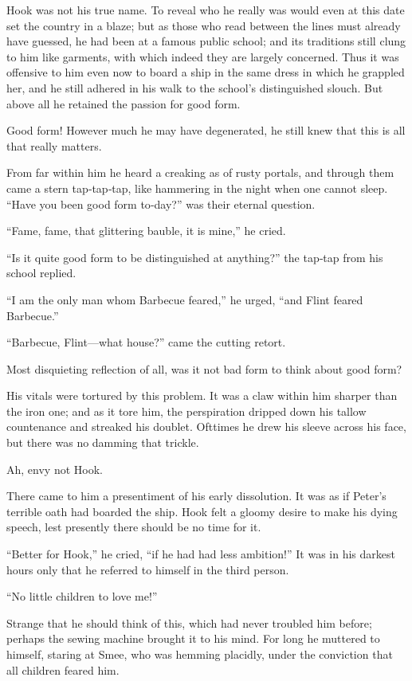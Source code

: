 Hook was not his true name.
To reveal who he really was would even at this date set the country in a blaze;
but as those who read between the lines must already have guessed, he had been at a famous public school;
and its traditions still clung to him like garments,
with which indeed they are largely concerned.
Thus it was offensive to him even now to board a ship in the same dress in which he grappled her,
and he still adhered in his walk to the school’s distinguished slouch.
But above all he retained the passion for good form.

Good form!
However much he may have degenerated, he still knew that this is all that really matters.

From far within him he heard a creaking as of rusty portals,
and through them came a stern tap‐tap‐tap, like hammering in the night when one cannot sleep.
“Have you been good form to‐day?\@” was their eternal question.

“Fame, fame, that glittering bauble, it is mine,” he cried.

“Is it quite good form to be distinguished at anything?\@” the tap‐tap from his school replied.

“I am the only man whom Barbecue feared,” he urged, “and Flint feared Barbecue.”

“Barbecue, Flint—what house?\@” came the cutting retort.

Most disquieting reflection of all, was it not bad form to think about good form?

His vitals were tortured by this problem.
It was a claw within him sharper than the iron one;
and as it tore him, the perspiration dripped down his tallow countenance and streaked his doublet.
Ofttimes he drew his sleeve across his face, but there was no damming that trickle.

Ah, envy not Hook.

There came to him a presentiment of his early dissolution.
It was as if Peter’s terrible oath had boarded the ship.
Hook felt a gloomy desire to make his dying speech,
lest presently there should be no time for it.

“Better for Hook,” he cried, “if he had had less ambition!”
It was in his darkest hours only that he referred to himself in the third person.

“No little children to love me!”

Strange that he should think of this, which had never troubled him before;
perhaps the sewing machine brought it to his mind.
For long he muttered to himself, staring at Smee, who was hemming placidly,
under the conviction that all children feared him.

